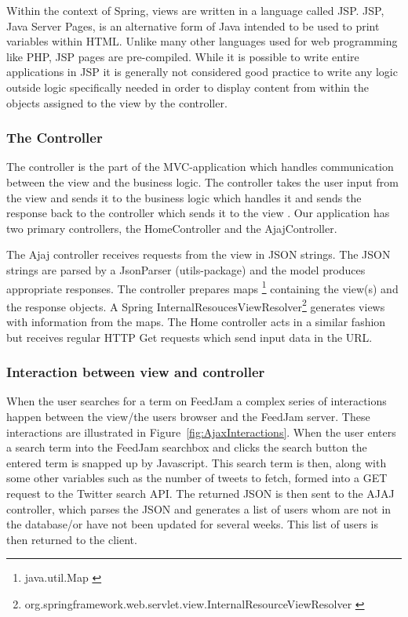 Within the context of Spring, views are written in a language called JSP. JSP, Java Server Pages, is an alternative form of Java intended to be used to print variables within HTML. Unlike many other languages used for web programming like PHP, JSP pages are pre-compiled. While it is possible to write entire applications in JSP it is generally not considered good practice to write any logic outside logic specifically needed in order to display content from within the objects assigned to the view by the controller.

\subsubsection{The Controller}
The controller is the part of the MVC-application which handles communication between the view and the business logic. The controller takes the user input from the view and sends it to the business logic which handles it and sends the response back to the controller which sends it to the view \citep{Oracle}. Our application has two primary controllers, the HomeController and the AjajController. 

The Ajaj controller receives requests from the view in JSON strings. The JSON strings are parsed by a JsonParser (utils-package) and the model produces appropriate responses. The controller prepares maps \footnote{java.util.Map \citep{Oraclea}} containing the view(s) and the response objects. A Spring InternalResoucesViewResolver\footnote{org.springframework.web.servlet.view.InternalResourceViewResolver \citep{TheSpring}}  generates views with information  from the maps. The Home controller acts in a similar fashion but receives regular HTTP Get requests which send input data in the URL.

\subsubsection{Interaction between view and controller} %
\label{viewControllerInteraction}
When the user searches for a term on FeedJam a complex series of interactions happen between the view/the users browser and the FeedJam server. These interactions are illustrated in Figure~\ref{fig:AjaxInteractions}. When the user enters a search term into the FeedJam searchbox and clicks the search button the entered term is snapped up by Javascript. This search term is then, along with some other variables such as the number of tweets to fetch, formed into a GET request to the Twitter search API. The returned JSON is then sent to the AJAJ controller, which parses the JSON and generates a list of users whom are not in the database/or have not been updated for several weeks. This list of users is then returned to the client.


